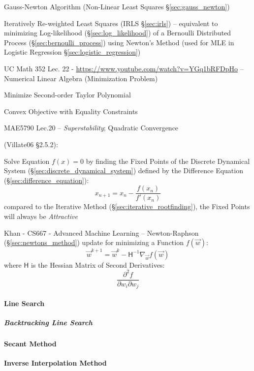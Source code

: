 \fist Gauss-Newton Algorithm (Non-Linear Least Squares \S\ref{sec:gauss_newton})

\fist Iteratively Re-weighted Least Squares (IRLS \S\ref{sec:irls}) --
equivalent to minimizing Log-likelihood (\S\ref{sec:log_likelihood}) of a
Bernoulli Distributed Process (\S\ref{sec:bernoulli_process}) using Newton's
Method (used for MLE in Logistic Regression \S\ref{sec:logistic_regression})

UC Math 352 Lec. 22 - \url{https://www.youtube.com/watch?v=YGq1bRFDpHo} --
Numerical Linear Algebra (Minimization Problem)

Minimize Second-order Taylor Polynomial

Convex Objective with Equality Constraints

MAE5790 Lec.20 -- \emph{Superstability}; Quadratic Convergence

(Villate06 \S 2.5.2):

Solve Equation $f(x) = 0$ by finding the Fixed Points of the Discrete Dynamical
System (\S\ref{sec:discrete_dynamical_system}) defined by the Difference
Equation (\S\ref{sec:difference_equation}):
\[
  x_{n+1} = x_n - \frac{f(x_n)}{f'(x_n)}
\]
compared to the Iterative Method (\S\ref{sec:iterative_rootfinding}), the Fixed
Points will always be \emph{Attractive}

Khan - CS667 - Advanced Machine Learning --
Newton-Raphson (\S\ref{sec:newtons_method}) update for minimizing a Function
$f(\vec{w})$:
\[
  \vec{w}^{k+1} = \vec{w}^k - \mathsf{H}^{-1}\nabla_{\vec{w}} f(\vec{w})
\]
where $\mathsf{H}$ is the Hessian Matrix of Second Derivatives:
\[
  \frac{\partial^2 f}{\partial{w_i} \partial{w_j}}
\]


\paragraph{Line Search}\label{sec:line_search}\hfill

\subparagraph{Backtracking Line Search}\label{sec:backtracking_line_search}
\hfill



\paragraph{Secant Method}\label{sec:secant_method}\hfill

\paragraph{Inverse Interpolation Method}\label{sec:inverse_interpolation}\hfill



